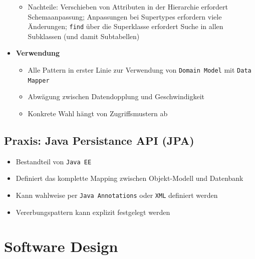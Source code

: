 \begin{itemize}
\begin{itemize}
		\item Nachteile: Verschieben von Attributen in der Hierarchie erfordert Schemaanpassung; Anpassungen bei Supertypes erfordern viele Änderungen; \texttt{find} über die Superklasse erfordert Suche in allen Subklassen (und damit Subtabellen)
	\end{itemize}
	\item \textbf{Verwendung}
	\begin{itemize}
		\item Alle Pattern in erster Linie zur Verwendung von \texttt{Domain Model} mit \texttt{Data Mapper}
		\item Abwägung zwischen Datendopplung und Geschwindigkeit
		\item Konkrete Wahl hängt von Zugriffsmustern ab
	\end{itemize}
\end{itemize}


\subsection{Praxis: Java Persistance API (JPA)}
\begin{itemize}
	\item Bestandteil von \texttt{Java EE}
	\item Definiert das komplette Mapping zwischen Objekt-Modell und Datenbank
	\item Kann wahlweise per \texttt{Java Annotations} oder \texttt{XML} definiert werden
	\item Vererbungspattern kann explizit festgelegt werden
\end{itemize}



\section{Software Design}

